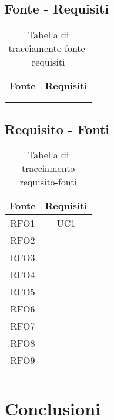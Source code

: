 \subsection{Fonte - Requisiti}
\begin{table}[H]
  \centering
  \begin{tabular}{|c|c|}
    \hline
    \rowcolor[HTML]{036400}
    {\color[HTML]{FFFFFF} Fonte} & {\color[HTML]{FFFFFF} Requisiti} \\ \hline
    \rowcolor[HTML]{EFEFEF}
    &  \\ \hline
    \rowcolor[HTML]{C0C0C0}
    &  \\ \hline
  \end{tabular}
  \caption{Tabella di tracciamento fonte-requisiti}
\end{table}

\subsection{Requisito - Fonti}
\begin{table}[H]
  \centering
  \begin{tabular}{|c|c|}
    \hline
    \rowcolor[HTML]{036400}
    {\color[HTML]{FFFFFF} Fonte} & {\color[HTML]{FFFFFF} Requisiti} \\ \hline
    \rowcolor[HTML]{EFEFEF}
    RFO1 & UC1 \\ \hline
    \rowcolor[HTML]{C0C0C0}
    RFO2 &  \\ \hline
    \rowcolor[HTML]{EFEFEF}
    RFO3 &  \\ \hline
    \rowcolor[HTML]{C0C0C0}
    RFO4 &  \\ \hline
    \rowcolor[HTML]{EFEFEF}
    RFO5 &  \\ \hline
    \rowcolor[HTML]{C0C0C0}
    RFO6 &  \\ \hline
    \rowcolor[HTML]{EFEFEF}
    RFO7 &  \\ \hline
    \rowcolor[HTML]{C0C0C0}
    RFO8 &  \\ \hline
    \rowcolor[HTML]{EFEFEF}
    RFO9 &  \\ \hline
    \rowcolor[HTML]{C0C0C0}
    &  \\ \hline
  \end{tabular}
  \caption{Tabella di tracciamento requisito-fonti}
\end{table}

\section{Conclusioni}
